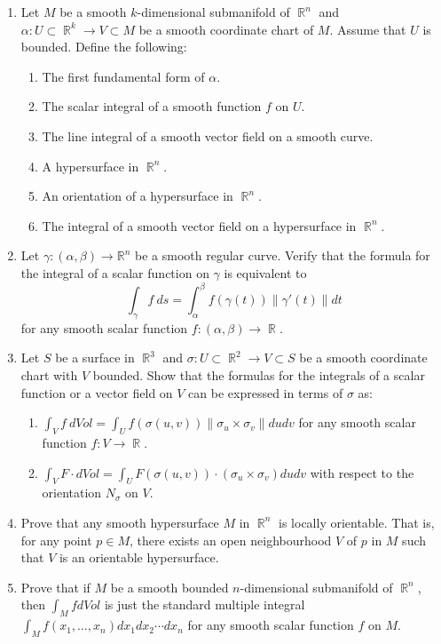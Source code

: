 \documentclass{article}
\DeclareMathOperator{\R}{\mathbb{R}}
\begin{document}
\begin{enumerate}
\item 
Let $M$ be a smooth $k$-dimensional submanifold of $\R^n$ and $\alpha: U \subset \R^k \rightarrow V \subset M$ be a smooth coordinate chart of $M$. Assume that $U$ is bounded.
Define the following:
\begin{enumerate}
\item The first fundamental form of $\alpha$.
\item The scalar integral of a smooth function $f$ on $U$.
\item The line integral of a smooth vector field on a smooth curve.
\item A hypersurface in $\R^n$.
\item An orientation of a hypersurface in $\R^n$.
\item The integral of a smooth vector field on a hypersurface in $\R^n$.

\end{enumerate}

\item
Let $\gamma: (\alpha, \beta) \rightarrow \mathbb{R}^n$ be a smooth regular curve. Verify that the formula for the integral of a scalar function on $\gamma$ is equivalent to
\[  \int_\gamma f \ ds = \int_\alpha^\beta f(\gamma(t))\| \gamma'(t) \| dt\] 
for any smooth scalar function $f:(\alpha,\beta) \rightarrow \R$.

\item
Let $S$ be a surface in $\R^3$ and $\sigma: U \subset \R^2 \rightarrow V \subset S$ be a smooth coordinate chart with $V$ bounded. Show that the formulas for the integrals of a scalar function or a vector field on $V$ can be expressed in terms of $\sigma$ as:
\begin{enumerate}
\item
$\int_V f \ dVol = \int_U f(\sigma(u,v))\| \sigma_u \times \sigma_v \| dudv$ for any smooth scalar function $f:V \rightarrow \R$.
\item
$\int_V F \cdot dVol = \int_U F(\sigma(u,v)) \cdot (\sigma_u \times \sigma_v ) dudv$ with respect to the orientation $N_\sigma$ on $V$.
\end{enumerate}

\item Prove that any smooth hypersurface $M$ in $\R^n$ is locally orientable. That is, for any point $p \in M$, there exists an open neighbourhood $V$ of $p$ in $M$ such that $V$ is an orientable hypersurface.

\item Prove that if $M$ be a smooth bounded $n$-dimensional submanifold of $\R^n$,  then $\int_M f dVol$ is just the standard multiple integral $\int_M f(x_1,\dots,x_n)dx_1dx_2 \cdots dx_n$ for any smooth scalar function $f$ on $M$.


\end{enumerate}
\end{document}
